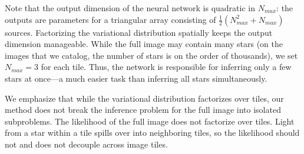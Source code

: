 

Note that the output dimension of the neural network is quadratic in $N_{max}$: the outputs are parameters for a triangular array consisting of $\frac{1}{2}(N_{max}^2 + N_{max})$ sources.
Factorizing the variational distribution spatially keeps the output dimension manageable.
While the full image may contain many stars
(on the images that we catalog, the number of stars is on the order of thousands),
we set $N_{max} = 3$ for each tile.
Thus, the network is responsible for inferring only a few stars at once---a much easier task than inferring all stars simultaneously.

We emphasize that while the variational distribution factorizes over tiles, our method does not break the inference problem for the full image into isolated subproblems.
The likelihood of the full image does not factorize over tiles. Light from a star within a tile spills over into neighboring tiles, so the likelihood should not and does not decouple across image tiles.
